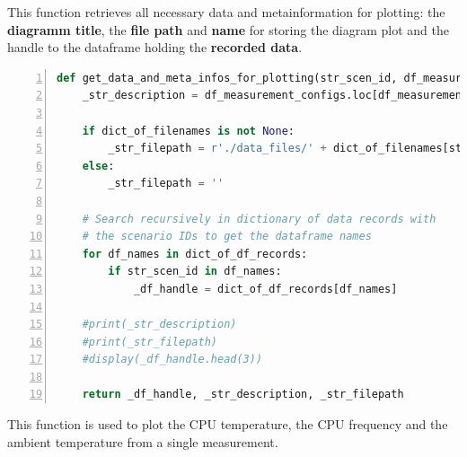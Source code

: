 \documentclass[10pt,parskip=half,
toc=sectionentrywithdots,
bibliography=totocnumbered,
captions=tableheading,numbers=noendperiod]{scrartcl}
\begin{document}
This function retrieves all necessary data and metainformation for
plotting: the \textbf{diagramm title}, the \textbf{file path} and
\textbf{name} for storing the diagram plot and the handle to the
dataframe holding the \textbf{recorded data}.

\begin{lstlisting}[language=Python,numbers=left,xleftmargin=20pt,xrightmargin=5pt,belowskip=5pt,aboveskip=5pt]
def get_data_and_meta_infos_for_plotting(str_scen_id, df_measurement_configs=None, dict_of_df_records=None, dict_of_filenames=None):
    _str_description = df_measurement_configs.loc[df_measurement_configs['Scenario IDs'] == str_scen_id, 'Diagramm description'].iloc[0]

    if dict_of_filenames is not None:
        _str_filepath = r'./data_files/' + dict_of_filenames[str_scen_id]
    else:
        _str_filepath = ''

    # Search recursively in dictionary of data records with
    # the scenario IDs to get the dataframe names
    for df_names in dict_of_df_records:
        if str_scen_id in df_names:
            _df_handle = dict_of_df_records[df_names]

    #print(_str_description)
    #print(_str_filepath)
    #display(_df_handle.head(3))

    return _df_handle, _str_description, _str_filepath
\end{lstlisting}

This function is used to plot the CPU temperature, the CPU frequency and
the ambient temperature from a single measurement.
\end{document}
